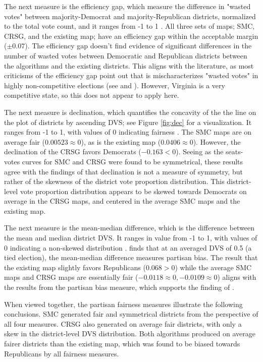 The next measure is the efficiency gap, which measure the difference in "wasted votes" between majority-Democrat and majority-Republican districts, normalized to the total vote count, and it ranges from -1 to 1 \parencite{stephanopoulos2014}. All three sets of maps; SMC, CRSG, and the existing map; have an efficiency gap within the acceptable margin ($\pm 0.07$). The efficiency gap doesn't find evidence of significant differences in the number of wasted votes between Democratic and Republican districts between the algorithms and the existing districts. This aligns with the literature, as most criticisms of the efficiency gap point out that is mischaracterizes "wasted votes" in highly non-competitive elections (see \textcite{veomett2018} and \textcite{katz2020}). However, Virginia is a very competitive state, so this does not appear to apply here.

The next measure is declination, which quantifies the concavity of the the line on the plot of districts by ascending DVS; see Figure \ref{fig:dec} for a visualization. It ranges from -1 to 1, with values of 0 indicating fairness \parencite{warrington2018}. The SMC maps are on average fair ($0.00523 \approx 0$), as is the existing map ($0.0406 \approx 0$). However, the declination of the CRSG favors Democrats ($-0.163 < 0$). Seeing as the seats-votes curves for SMC and CRSG were found to be symmetrical, these results agree with the findings of \textcite{katz2020} that declination is not a measure of symmetry, but rather of the skewness of the district vote proportion distribution. This district-level vote proportion distribution appears to be skewed towards Democrats on average in the CRSG maps, and centered in the average SMC maps and the existing map. 

The next measure is the mean-median difference, which is the difference between the mean and median district DVS. It ranges in value from -1 to 1, with values of 0 indicating a non-skewed distribution \parencite{mcdonald2015}. \textcite{katz2020} finds that at an averaged DVS of 0.5 (a tied election), the mean-median difference measures partisan bias. The result that the existing map slightly favors Republicans ($0.068 > 0$) while the average SMC maps and CRSG maps are essentially fair ($-0.0118 \approx 0, -0.0109 \approx 0$) aligns with the results from the partisan bias measure, which supports the finding of \textcite{katz2020}. 

When viewed together, the partisan fairness measures illustrate the following conclusions. SMC generated fair and symmetrical districts from the perspective of all four measures. CRSG also generated on average fair districts, with only a skew in the district-level DVS distribution. Both algorithms produced on average fairer districts than the existing map, which was found to be biased towards Republicans by all fairness measures. 

